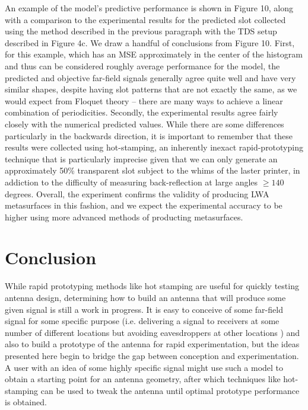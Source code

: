 \documentclass[11pt]{article}
\begin{document}
\noindent An example of the model's predictive performance is shown in Figure 10, along with a comparison to the experimental results for the predicted slot collected using the method described in the previous paragraph with the TDS setup described in Figure 4c. We draw a handful of conclusions from Figure 10. First, for this example, which has an MSE approximately in the center of the histogram and thus can be considered roughly average performance for the model, the predicted and objective far-field signals generally agree quite well and have very similar shapes, despite having slot patterns that are not exactly the same, as we would expect from Floquet theory -- there are many ways to achieve a linear combination of periodicities. Secondly, the experimental results agree fairly closely with the numerical predicted values. While there are some differences particularly in the backwards direction, it is important to remember that these results were collected using hot-stamping, an inherently inexact rapid-prototyping technique that is particularly imprecise given that we can only generate an approximately 50\% transparent slot subject to the whims of the laster printer, in addiction to the difficulty of measuring back-reflection at large angles $\geq 140$ degrees.  Overall, the experiment confirms the validity of producing LWA metasurfaces in this fashion, and we expect the experimental accuracy to be higher using more advanced methods of producting metasurfaces.

\section*{Conclusion}

\noindent While rapid prototyping methods like hot stamping are useful for quickly testing antenna design, determining how to build an antenna that will produce some given signal is still a work in progress. It is easy to conceive of some far-field signal for some specific purpose (i.e. delivering a signal to receivers at some number of different locations but avoiding eavesdroppers at other locations	) and also to build a prototype of the antenna for rapid experimentation, but the ideas presented here begin to bridge the gap between conception and experimentation. A user with an idea of some highly specific signal might use such a model to obtain a starting point for an antenna geometry, after which techniques like hot-stamping can be used to tweak the antenna until optimal prototype performance is obtained. \\
\end{document}
